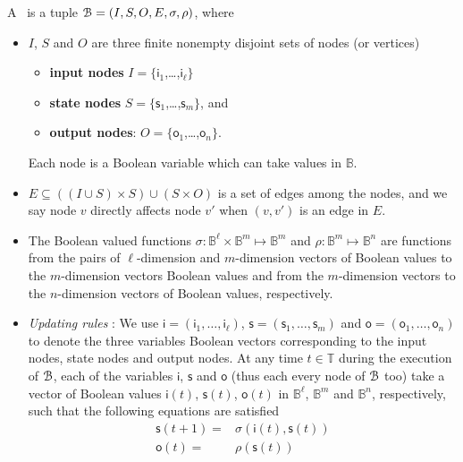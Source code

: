 \begin{definition} 
\label{def:BCN}
A \BCN\ is a tuple ${\mathcal{B}} = (I,S,O, E, \sigma, \rho)$, where 
\begin{itemize}
\item $I$, $S$ and $O$ are three finite nonempty disjoint sets of nodes (or vertices)
\begin{itemize}
	\item {\bf input nodes} $I=\{\mathsf{i}_1$,\ldots ,$\mathsf{i}_{\ell}\}$
	\item {\bf state nodes}  $S= \{\mathsf{s}_1$,\ldots ,$\mathsf{s}_m\}$, and 
	\item {\bf output nodes}: $O= \{\mathsf{o}_1$,\ldots ,$\mathsf{o}_n\}$.
	\end{itemize}	
	Each node is a Boolean variable which can take values in $\mathbb{B}$.
\item  $E \subseteq ((I\cup S)\times S)\cup (S\times O)$ is a set of edges among the nodes, and we say node $v$ directly affects node  $v'$  when $(v,v')$ is an edge in $E$.
\item The Boolean valued functions $\sigma: \mathbb{B}^\ell\times  \mathbb{B}^m \mapsto \mathbb{B}^m$ and $\rho: \mathbb{B}^m\mapsto \mathbb{B}^n$ are functions from the pairs of $\ell$-dimension and $m$-dimension vectors  of Boolean values to  the $m$-dimension vectors Boolean values and from the  $m$-dimension vectors to the  $n$-dimension vectors  of Boolean values, respectively. 
\item {\em Updating rules }:  We use 
 $\mathsf{i}= (\mathsf{i}_1,\ldots, \mathsf{i}_\ell)$, $\mathsf{s}= (\mathsf{s}_1,\ldots, \mathsf{s}_m)$ and $\mathsf{o}= (\mathsf{o}_1,\ldots, \mathsf{o}_n)$ to denote the three variables Boolean vectors corresponding  to the input nodes, state nodes and output nodes. At any time $t\in \mathbb{T}$ during the execution 
 of ${\mathcal{B}}$, each of the variables  $\mathsf{i}$, $\mathsf{s}$ and $\mathsf{o}$  (thus each every node of ${\mathcal{B}}$ too) take a vector of Boolean values $\mathsf{i}(t)$, $\mathsf{s}(t)$, $\mathsf{o}(t)$  in  $\mathbb{B}^\ell$, $\mathbb{B}^m$ and $\mathbb{B}^n$, respectively, such that the following equations are satisfied
\begin{equation}
\begin{split}
\mathsf{s}(t+1)=&\sigma(\mathsf{i}(t),\mathsf{s}(t))\\
\mathsf{o}(t)=&\rho(\mathsf{s}(t))
\end{split}

\end{equation}
\end{itemize}
\end{definition}
